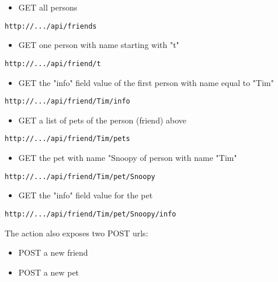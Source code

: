 \documentclass[justified,sixbynine,notoc]{tufte-book}
\begin{document}
\begin{fullwidth}
\begin{itemize}
\item GET all persons
\end{itemize}
\begin{lstlisting}[keywords={}]
http://.../api/friends
\end{lstlisting}
\begin{itemize}
\item GET one person with name starting with "t"
\end{itemize}
\begin{lstlisting}[keywords={}]
http://.../api/friend/t
\end{lstlisting}
\begin{itemize}
\item GET the "info" field value of the first person with name equal to "Tim"
\end{itemize}
\begin{lstlisting}[keywords={}]
http://.../api/friend/Tim/info
\end{lstlisting}
\begin{itemize}
\item GET a list of pets of the person (friend) above
\end{itemize}
\begin{lstlisting}[keywords={}]
http://.../api/friend/Tim/pets
\end{lstlisting}
\begin{itemize}
\item GET the pet with name "Snoopy of person with name "Tim"
\end{itemize}
\begin{lstlisting}[keywords={}]
http://.../api/friend/Tim/pet/Snoopy
\end{lstlisting}
\begin{itemize}
\item GET the "info" field value for the pet
\end{itemize}
\begin{lstlisting}[keywords={}]
http://.../api/friend/Tim/pet/Snoopy/info
\end{lstlisting}

The action also exposes two POST urls:

\begin{itemize}
\item POST a new friend

\item POST a new pet
\end{itemize}


\end{fullwidth}
\end{document}

